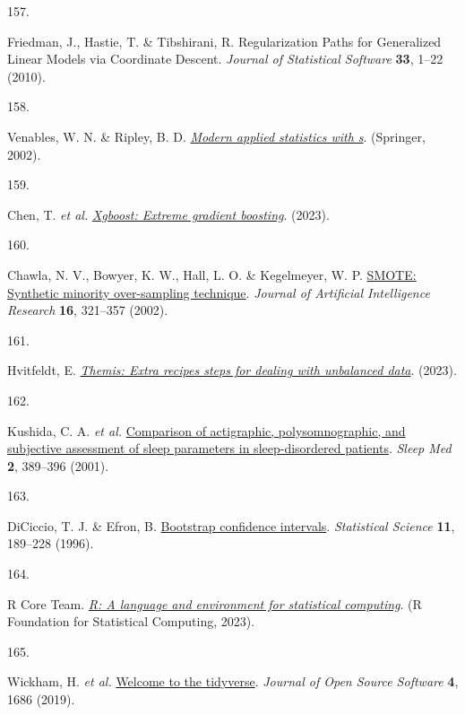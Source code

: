 \documentclass[
  10pt,
]{scrbook}
\newlength{\cslhangindent}
\newlength{\csllabelwidth}
\newlength{\cslentryspacingunit} %
\newenvironment{CSLReferences}[2] %
 {%
  \setlength{\parindent}{0pt}
  \ifodd #1
  \let\oldpar\par
  \def\par{\hangindent=\cslhangindent\oldpar}
  \fi
  \setlength{\parskip}{#2\cslentryspacingunit}
 }%
 {}
\newcommand{\CSLLeftMargin}[1]{\parbox[t]{\csllabelwidth}{#1}}
\newcommand{\CSLRightInline}[1]{\parbox[t]{\linewidth - \csllabelwidth}{#1}\break}
\let\originaltextbf\textbf
\renewcommand{\textbf}[1]{\textcolor{color1}{\textsf{\originaltextbf{#1}}}}
\begin{document}
\begin{CSLReferences}{0}{0}
\leavevmode{}%
\CSLLeftMargin{157. }%
\CSLRightInline{Friedman, J., Hastie, T. \& Tibshirani, R.
Regularization Paths for Generalized Linear Models via Coordinate
Descent. \emph{Journal of Statistical Software} \textbf{33}, 1--22
(2010).}

\leavevmode{}%
\CSLLeftMargin{158. }%
\CSLRightInline{Venables, W. N. \& Ripley, B. D.
\emph{\href{https://www.stats.ox.ac.uk/pub/MASS4/}{Modern applied
statistics with s}}. (Springer, 2002).}

\leavevmode{}%
\CSLLeftMargin{159. }%
\CSLRightInline{Chen, T. \emph{et al.}
\emph{\href{https://CRAN.R-project.org/package=xgboost}{Xgboost: Extreme
gradient boosting}}. (2023).}

\leavevmode{}%
\CSLLeftMargin{160. }%
\CSLRightInline{Chawla, N. V., Bowyer, K. W., Hall, L. O. \& Kegelmeyer,
W. P. \href{https://doi.org/10.1613/jair.953}{{SMOTE}: Synthetic
minority over-sampling technique}. \emph{Journal of Artificial
Intelligence Research} \textbf{16}, 321--357 (2002).}

\leavevmode{}%
\CSLLeftMargin{161. }%
\CSLRightInline{Hvitfeldt, E.
\emph{\href{https://CRAN.R-project.org/package=themis}{Themis: Extra
recipes steps for dealing with unbalanced data}}. (2023).}

\leavevmode{}%
\CSLLeftMargin{162. }%
\CSLRightInline{Kushida, C. A. \emph{et al.}
\href{https://doi.org/10.1016/s1389-9457(00)00098-8}{Comparison of
actigraphic, polysomnographic, and subjective assessment of sleep
parameters in sleep-disordered patients}. \emph{Sleep Med} \textbf{2},
389--396 (2001).}

\leavevmode{}%
\CSLLeftMargin{163. }%
\CSLRightInline{DiCiccio, T. J. \& Efron, B.
\href{https://doi.org/10.1214/ss/1032280214}{Bootstrap confidence
intervals}. \emph{Statistical Science} \textbf{11}, 189--228 (1996).}

\leavevmode{}%
\CSLLeftMargin{164. }%
\CSLRightInline{R Core Team. \emph{\href{https://www.R-project.org/}{R:
A language and environment for statistical computing}}. (R Foundation
for Statistical Computing, 2023).}

\leavevmode{}%
\CSLLeftMargin{165. }%
\CSLRightInline{Wickham, H. \emph{et al.}
\href{https://doi.org/10.21105/joss.01686}{Welcome to the tidyverse}.
\emph{Journal of Open Source Software} \textbf{4}, 1686 (2019).}


\end{CSLReferences}
\end{document}
